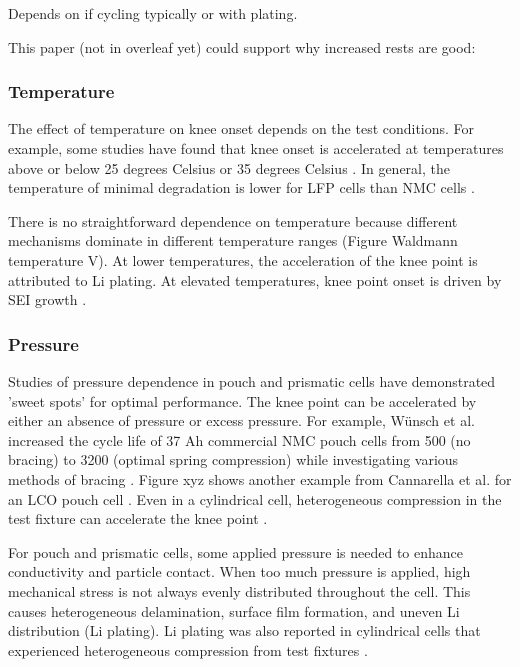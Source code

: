 \documentclass{article}
\begin{document}
Depends on if cycling typically or with plating.

This paper (not in overleaf yet) could support why increased rests are good:


\subsubsection{Temperature}
The effect of temperature on knee onset depends on the test conditions. For example, some studies have found that knee onset is accelerated at temperatures above or below 25 degrees Celsius \cite{zhang_accelerated_2019, waldmann_temperature_2014, waldmann_optimization_2015} or 35 degrees Celsius \cite{schuster_nonlinear_2015}. In general, the temperature of minimal degradation is lower for LFP cells than NMC cells \cite{SNL long-term cycling paper}. 

There is no straightforward dependence on temperature because different mechanisms dominate in different temperature ranges (Figure Waldmann temperature V). At lower temperatures, the acceleration of the knee point is attributed to Li plating. At elevated temperatures, knee point onset is driven by SEI growth \cite {zhang_accelerated_2019,schuster_nonlinear_2015,waldmann_temperature_2014,waldmann_optimization_2015}.

\subsubsection{Pressure}
Studies of pressure dependence in pouch and prismatic cells have demonstrated 'sweet spots' for optimal performance. The knee point can be accelerated by either an absence of pressure or excess pressure. For example, Wünsch et al. increased the cycle life of 37 Ah commercial NMC pouch cells from 500 (no bracing) to 3200 (optimal spring compression) while investigating various methods of bracing \cite{wunsch_investigation_2019}. Figure xyz shows another example from Cannarella et al. for an LCO pouch cell \cite{cannarella_stress_2014}. Even in a cylindrical cell, heterogeneous compression in the test fixture can accelerate the knee point \cite{bach_nonlinear_2016}. 

For pouch and prismatic cells, some applied pressure is needed to enhance conductivity and particle contact. When too much pressure is applied, high mechanical stress is not always evenly distributed throughout the cell. This causes heterogeneous delamination, surface film formation, and uneven Li distribution (Li plating). Li plating was also reported in cylindrical cells that experienced heterogeneous compression from test fixtures \cite{bach_nonlinear_2016}. 
\end{document}
